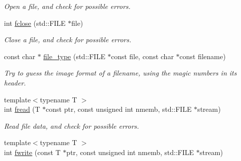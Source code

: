 \begin{DoxyCompactItemize}
\begin{DoxyCompactList}\small\item\em Open a file, and check for possible errors. \item\end{DoxyCompactList}\item 
\hypertarget{namespacecimg__library_1_1cimg_ae54f76e8c2bcff93277e9cae1906a3d6}{
int \hyperlink{namespacecimg__library_1_1cimg_ae54f76e8c2bcff93277e9cae1906a3d6}{fclose} (std::FILE $\ast$file)}
\label{namespacecimg__library_1_1cimg_ae54f76e8c2bcff93277e9cae1906a3d6}

\begin{DoxyCompactList}\small\item\em Close a file, and check for possible errors. \item\end{DoxyCompactList}\item 
\hypertarget{namespacecimg__library_1_1cimg_aa7b1171b457d627d0d2796c89e083d8b}{
const char $\ast$ \hyperlink{namespacecimg__library_1_1cimg_aa7b1171b457d627d0d2796c89e083d8b}{file\_\-type} (std::FILE $\ast$const file, const char $\ast$const filename)}
\label{namespacecimg__library_1_1cimg_aa7b1171b457d627d0d2796c89e083d8b}

\begin{DoxyCompactList}\small\item\em Try to guess the image format of a filename, using the magic numbers in its header. \item\end{DoxyCompactList}\item 
\hypertarget{namespacecimg__library_1_1cimg_acff6f67e3db01f50704f81d44d43853d}{
{\footnotesize template$<$typename T $>$ }\\int \hyperlink{namespacecimg__library_1_1cimg_acff6f67e3db01f50704f81d44d43853d}{fread} (T $\ast$const ptr, const unsigned int nmemb, std::FILE $\ast$stream)}
\label{namespacecimg__library_1_1cimg_acff6f67e3db01f50704f81d44d43853d}

\begin{DoxyCompactList}\small\item\em Read file data, and check for possible errors. \item\end{DoxyCompactList}\item 
\hypertarget{namespacecimg__library_1_1cimg_acfd152b250d25cd25b1622537b23c9b7}{
{\footnotesize template$<$typename T $>$ }\\int \hyperlink{namespacecimg__library_1_1cimg_acfd152b250d25cd25b1622537b23c9b7}{fwrite} (const T $\ast$ptr, const unsigned int nmemb, std::FILE $\ast$stream)}
\label{namespacecimg__library_1_1cimg_acfd152b250d25cd25b1622537b23c9b7}


\end{DoxyCompactItemize}
